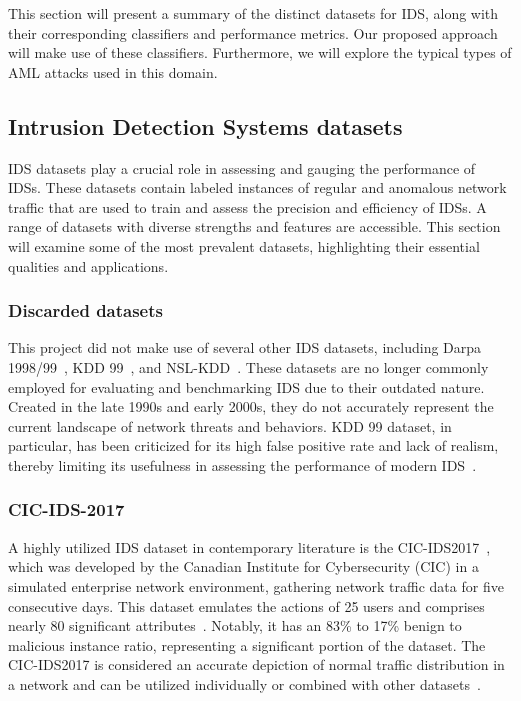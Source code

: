 This section will present a summary of the distinct datasets for IDS, along with their corresponding classifiers and
performance metrics.
Our proposed approach will make use of these classifiers.
Furthermore, we will explore the typical types of AML attacks used in this domain.

\subsection{Intrusion Detection Systems datasets}\label{subsec:intrusion-detection-systems-datasets}

IDS datasets play a crucial role in assessing and gauging the performance of IDSs.
These datasets contain labeled instances of regular and anomalous network traffic that are used to train and assess the
precision and efficiency of IDSs.
A range of datasets with diverse strengths and features are accessible.
This section will examine some of the most prevalent datasets, highlighting their essential qualities and applications.

\subsubsection{Discarded datasets}
This project did not make use of several other IDS datasets, including Darpa 1998/99~\cite{darpa1999},
KDD 99~\cite{KDDCUP99}, and NSL-KDD~\cite{KDDCUP99}.
These datasets are no longer commonly employed for evaluating and benchmarking IDS due to their outdated nature.
Created in the late 1990s and early 2000s, they do not accurately represent the current landscape of network threats
and behaviors.
KDD 99 dataset, in particular, has been criticized for its high false positive rate and lack of realism, thereby
limiting its usefulness in assessing the performance of modern IDS~\cite{hugh2000, KDDFaults}.

\subsubsection{CIC-IDS-2017}
A highly utilized IDS dataset in contemporary literature is the CIC-IDS2017~\cite{CICIDS2017}, which was developed
by the Canadian Institute for Cybersecurity (CIC) in a simulated enterprise network environment, gathering network
traffic data for five consecutive days.
This dataset emulates the actions of 25 users and comprises nearly 80 significant attributes~\cite{RING2019147}.
Notably, it has an 83\% to 17\% benign to malicious instance ratio, representing a significant portion of the dataset.
The CIC-IDS2017 is considered an accurate depiction of normal traffic distribution in a network and can be utilized
individually or combined with other datasets~\cite{Shroff2022}.

